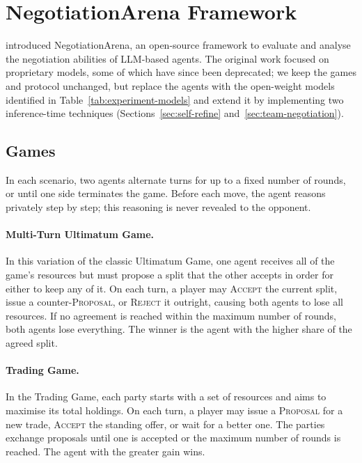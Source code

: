 \section{NegotiationArena Framework} \label{sec:na-framework}

\textcite{bianchi_how_2024} introduced NegotiationArena, an open-source framework to evaluate and analyse the negotiation abilities of LLM-based agents. The original work focused on proprietary models, some of which have since been deprecated; we keep the games and protocol unchanged, but replace the agents with the open-weight models identified in Table~\ref{tab:experiment-models} and extend it by implementing two inference-time techniques (Sections~\ref{sec:self-refine} and~\ref{sec:team-negotiation}). 

\subsection{Games} \label{sec:games}

In each scenario, two agents alternate turns for up to a fixed number of rounds, or until one side terminates the game. Before each move, the agent reasons privately step by step; this reasoning is never revealed to the opponent.

\paragraph{Multi-Turn Ultimatum Game.}
In this variation of the classic Ultimatum Game, one agent receives all of the game's resources but must propose a split that the other accepts in order for either to keep any of it. On each turn, a player may \textsc{Accept} the current split, issue a counter-\textsc{Proposal}, or \textsc{Reject} it outright, causing both agents to lose all resources. If no agreement is reached within the maximum number of rounds, both agents lose everything. The winner is the agent with the higher share of the agreed split.

\paragraph{Trading Game.}
In the Trading Game, each party starts with a set of resources and aims to maximise its total holdings. On each turn, a player may issue a \textsc{Proposal} for a new trade, \textsc{Accept} the standing offer, or wait for a better one. The parties exchange proposals until one is accepted or the maximum number of rounds is reached. The agent with the greater gain wins.

